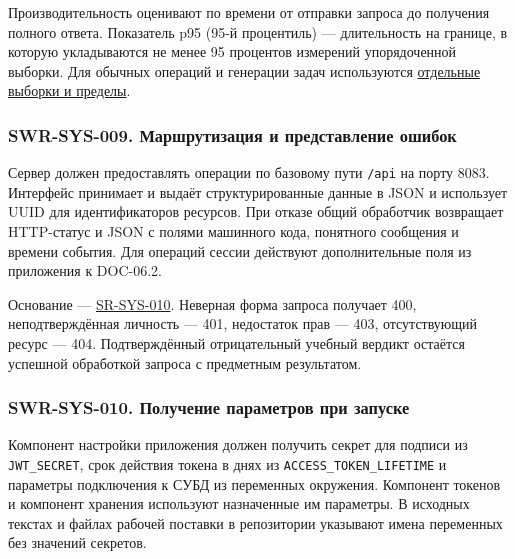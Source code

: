 \documentclass[12pt,a4paper]{article}
\begin{document}
Производительность оценивают по времени от отправки запроса до получения полного ответа. Показатель p95 (95-й процентиль) --- длительность на границе, в которую укладываются не менее 95 процентов измерений упорядоченной выборки. Для обычных операций и генерации задач используются {\hyperlink{swr-sys-013-время-ответа-обычных-операций}{отдельные выборки и пределы}}.

\subsubsection{SWR-SYS-009. Маршрутизация и представление ошибок}\label{swr-sys-009-ux43cux430ux440ux448ux440ux443ux442ux438ux437ux430ux446ux438ux44f-ux438-ux43fux440ux435ux434ux441ux442ux430ux432ux43bux435ux43dux438ux435-ux43eux448ux438ux431ux43eux43a}

\hypertarget{swr-sys-009-маршрутизация-и-представление-ошибок}{}

\hypertarget{swr-sys-009}{}

Сервер должен предоставлять операции по базовому пути \texttt{/api} на порту 8083. Интерфейс принимает и выдаёт структурированные данные в JSON и использует UUID для идентификаторов ресурсов. При отказе общий обработчик возвращает HTTP-статус и JSON с полями машинного кода, понятного сообщения и времени события. Для операций сессии действуют дополнительные поля из приложения к DOC-06.2.

Основание --- {\href{../04\_Системные\_требования/DOC-05\_Системные\_требования.pdf\#sr-sys-010}{SR-SYS-010}}. Неверная форма запроса получает 400, неподтверждённая личность --- 401, недостаток прав --- 403, отсутствующий ресурс --- 404. Подтверждённый отрицательный учебный вердикт остаётся успешной обработкой запроса с предметным результатом.

\subsubsection{SWR-SYS-010. Получение параметров при запуске}\label{swr-sys-010-ux43fux43eux43bux443ux447ux435ux43dux438ux435-ux43fux430ux440ux430ux43cux435ux442ux440ux43eux432-ux43fux440ux438-ux437ux430ux43fux443ux441ux43aux435}

\hypertarget{swr-sys-010-получение-параметров-при-запуске}{}

\hypertarget{swr-sys-010}{}

Компонент настройки приложения должен получить секрет для подписи из \texttt{JWT\_SECRET}, срок действия токена в днях из \texttt{ACCESS\_\allowbreak{}TOKEN\_\allowbreak{}LIFETIME} и параметры подключения к СУБД из переменных окружения. Компонент токенов и компонент хранения используют назначенные им параметры. В исходных текстах и файлах рабочей поставки в репозитории указывают имена переменных без значений секретов.
\end{document}

